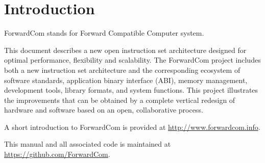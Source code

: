 \documentclass[forwardcom.tex]{subfiles}
\begin{document}
\RaggedRight

\chapter{Introduction}
ForwardCom stands for Forward Compatible Computer system.
\vv

This document describes a new open instruction set architecture designed for optimal performance, flexibility and scalability. The ForwardCom project includes both a new instruction set architecture and the corresponding ecosystem of software standards, application binary interface (ABI), memory management, development tools, library formats, and system functions. This project illustrates the improvements that can be obtained by a complete vertical redesign of hardware and software based on an open, collaborative process.
\vv

A short introduction to ForwardCom is provided at 
\href{http://www.forwardcom.info}{http://www.forwardcom.info}.
\vv

This manual and all associated code is maintained at 
\href{https://github.com/ForwardCom/}{https://github.com/ForwardCom}.

 
\end{document}
